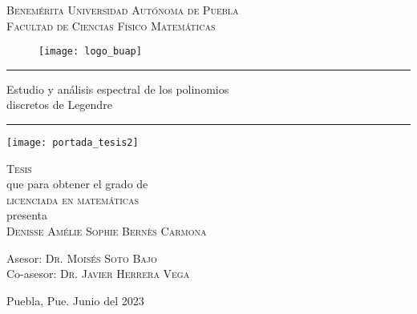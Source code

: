 
\thispagestyle{empty} %

\begin{center}
{\Large{
\textsc{Benemérita Universidad Autónoma de Puebla}
}} \\
\vspace{0.5cm}
{\Large{
\textsc{Facultad de Ciencias Físico Matemáticas}
}}
\end{center}


\begin{figure}[H]
	\centering
	\texttt{[image: logo\_buap]} 
\end{figure}	



\hrule
\vspace{0.5cm}
\begin{center}
{\Large {Estudio y análisis espectral de los polinomios \\
discretos de Legendre}}
\end{center}
\vspace{0.5cm}
\hrule


\begin{marginfigure}
\texttt{[image: portada\_tesis2]} 
\end{marginfigure}






\vspace{4cm}

\noindent
\textsc{Tesis} \\
que para obtener el grado de \\
\textsc{licenciada en matemáticas} \\
presenta \\
\textsc{Denisse Amélie Sophie Bernès Carmona}



\vspace{2cm}

\noindent
Asesor: \textsc{Dr. Moisés Soto Bajo} \\
Co-asesor: \textsc{Dr. Javier Herrera Vega} 




\vspace*{\fill}
Puebla, Pue. Junio del 2023 









\newpage